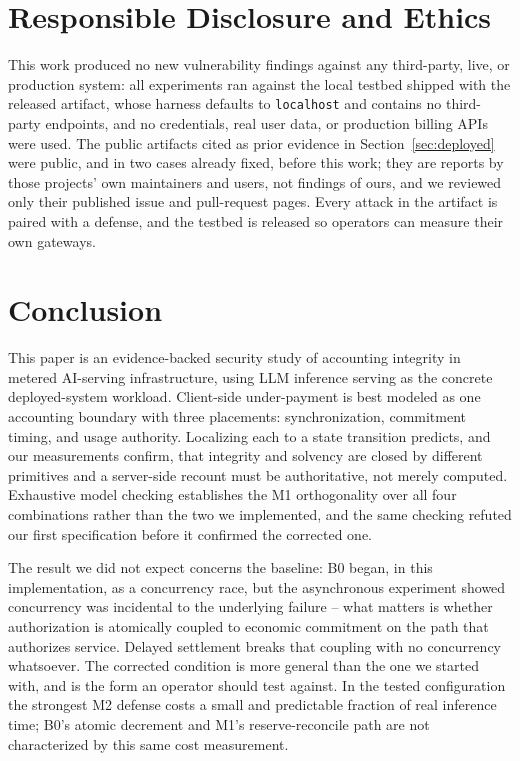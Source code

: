 \documentclass[manuscript,review]{acmart}
\begin{document}
\section{Responsible Disclosure and Ethics}
This work produced no new vulnerability findings against any third-party, live, or
production system: all experiments ran against the local testbed shipped with the
released artifact, whose harness defaults to \texttt{localhost} and contains no
third-party endpoints, and no credentials, real user data, or production billing APIs
were used. The public artifacts cited as prior evidence in Section~\ref{sec:deployed}
were public, and in two cases already fixed, before this work; they are reports by those
projects' own maintainers and users, not findings of ours, and we reviewed only their
published issue and pull-request pages. Every attack in the artifact is paired with a
defense, and the testbed is released so operators can measure their own gateways.

\section{Conclusion}
This paper is an evidence-backed security study of accounting integrity in metered
AI-serving infrastructure, using LLM inference serving as the concrete deployed-system
workload. Client-side under-payment
is best modeled as one accounting boundary with three placements: synchronization,
commitment timing, and usage authority. Localizing each to a state transition predicts,
and our measurements confirm, that integrity and solvency are closed by different
primitives and a server-side recount must be authoritative, not merely computed.
Exhaustive model checking establishes
the M1 orthogonality over all four combinations rather than the two we implemented, and
the same checking refuted our first specification before it confirmed the corrected one.

The result we did not expect concerns the baseline: B0 began, in this implementation, as
a concurrency race, but the asynchronous experiment showed concurrency was incidental to
the underlying failure -- what matters is whether authorization is atomically coupled to
economic commitment on the path that authorizes service. Delayed settlement breaks that
coupling with no concurrency whatsoever. The corrected condition is more general than the
one we started with, and is the form an operator should test against. In the tested configuration the strongest M2 defense costs a small and
predictable fraction of real inference time; B0's atomic decrement and M1's
reserve-reconcile path are not characterized by this same cost measurement.
\end{document}
